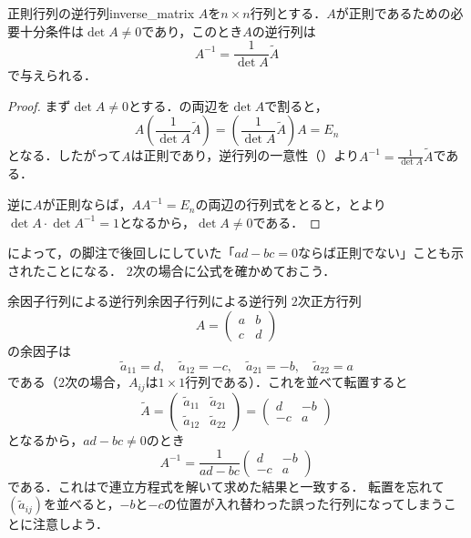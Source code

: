 \begin{cor}{正則行列の逆行列}{inverse_matrix}
  $A$を$n \times n$行列とする．$A$が正則であるための必要十分条件は$\det A \ne 0$であり，このとき$A$の逆行列は
  \[
  A^{-1} = \frac{1}{\det A} \tilde{A}
  \]
  で与えられる．
\end{cor}

\begin{tleftbar}
\begin{proof}
  まず$\det A \ne 0$とする．の両辺を$\det A$で割ると，
  \[
    A \left( \frac{1}{\det A} \tilde{A} \right)
    = \left( \frac{1}{\det A} \tilde{A} \right) A
    = E_n
  \]
  となる．したがって$A$は正則であり，逆行列の一意性（）より$A^{-1} = \frac{1}{\det A} \tilde{A}$である．

  逆に$A$が正則ならば，$AA^{-1} = E_n$の両辺の行列式をとると，とより$\det A \cdot \det A^{-1} = 1$となるから，$\det A \ne 0$である．
\end{proof}
\end{tleftbar}

によって，の脚注で後回しにしていた「$ad - bc = 0$ならば正則でない」ことも示されたことになる．
$2$次の場合に公式を確かめておこう．

\begin{example}{余因子行列による逆行列}{余因子行列による逆行列}
  $2$次正方行列
  \[
    A = \begin{pmatrix} a & b \\ c & d \end{pmatrix}
  \]
  の余因子は
  \[
    \tilde{a}_{11} = d, \quad \tilde{a}_{12} = -c, \quad \tilde{a}_{21} = -b, \quad \tilde{a}_{22} = a
  \]
  である（$2$次の場合，$A_{ij}$は$1 \times 1$行列である）．これを並べて転置すると
  \[
    \tilde{A} = \begin{pmatrix} \tilde{a}_{11} & \tilde{a}_{21} \\ \tilde{a}_{12} & \tilde{a}_{22} \end{pmatrix}
    = \begin{pmatrix} d & -b \\ -c & a \end{pmatrix}
  \]
  となるから，$ad - bc \ne 0$のとき
  \[
    A^{-1} = \frac{1}{ad - bc}\begin{pmatrix} d & -b \\ -c & a \end{pmatrix}
  \]
  である．これはで連立方程式を解いて求めた結果と一致する．
  転置を忘れて$(\tilde{a}_{ij})$を並べると，$-b$と$-c$の位置が入れ替わった誤った行列になってしまうことに注意しよう．
\end{example}

